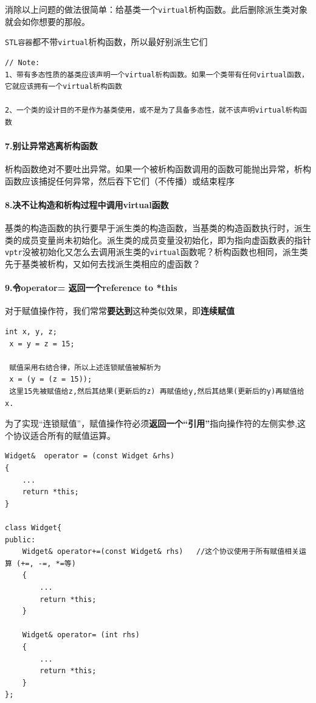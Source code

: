 \documentclass[UTF8,a4paper,12pt]{ctexbook}
\begin{document}
			消除以上问题的做法很简单：给基类一个\verb|virtual|析构函数。此后删除派生类对象就会如你想要的那般。
			
			 \verb|STL容器|都不带\verb|virtual|析构函数，所以最好别派生它们
			 
		\begin{lstlisting}[frame = lbrT,xleftmargin=.02\textwidth]
// Note:
1、带有多态性质的基类应该声明一个virtual析构函数。如果一个类带有任何virtual函数，它就应该拥有一个virtual析构函数

2、一个类的设计目的不是作为基类使用，或不是为了具备多态性，就不该声明virtual析构函数
		\end{lstlisting}
				 
		\paragraph{7.别让异常逃离析构函数} 析构函数绝对不要吐出异常。如果一个被析构函数调用的函数可能抛出异常，析构函数应该捕捉任何异常，然后吞下它们（不传播）或结束程序
		
		\paragraph{8.决不让构造和析构过程中调用virtual函数} 基类的构造函数的执行要早于派生类的构造函数，当基类的构造函数执行时，派生类的成员变量尚未初始化。派生类的成员变量没初始化，即为指向虚函数表的指针\verb|vptr|没被初始化又怎么去调用派生类的\verb|virtual|函数呢？析构函数也相同，派生类先于基类被析构，又如何去找派生类相应的虚函数？
		
		\paragraph{9.令operator= 返回一个reference to *this}
			对于赋值操作符，我们常常\textbf{要达到}这种类似效果，即\textbf{连续赋值}
			\begin{lstlisting}[xleftmargin=.04\textwidth]
 int x, y, z;
 x = y = z = 15;
 
 赋值采用右结合律，所以上述连锁赋值被解析为
 x = (y = (z = 15));
 这里15先被赋值给z,然后其结果(更新后的z) 再赋值给y,然后其结果(更新后的y)再赋值给x.
			\end{lstlisting}
			
			为了实现“连锁赋值”，赋值操作符必须\textbf{返回一个“引用”}指向操作符的左侧实参,这个协议适合所有的赋值运算。
			\begin{lstlisting}[xleftmargin=.04\textwidth]
Widget&  operator = (const Widget &rhs)
{
	...
	return *this;
}

class Widget{
public:
	Widget& operator+=(const Widget& rhs)   //这个协议使用于所有赋值相关运算 (+=, -=, *=等)
	{
		...
		return *this;
	}
	
	Widget& operator= (int rhs)
	{
		...
		return *this;
	}
};
			\end{lstlisting}
\end{document}
